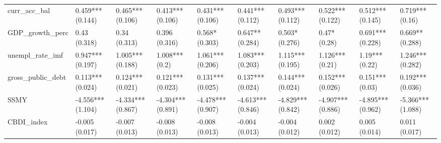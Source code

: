 \begin{table}[H]
\begin{subtable}[c]{\textwidth}
{\begin{tabular}{llllllllll}
  curr\_acc\_bal & 0.459*** (0.144) & 0.465*** (0.106) & 0.413*** (0.106) & 0.431*** (0.106) & 0.441*** (0.112) & 0.493*** (0.112) & 0.522*** (0.122) & 0.512*** (0.145) & 0.719*** (0.16) \\ 
  GDP\_growth\_perc & 0.43 (0.318) & 0.34 (0.313) & 0.396 (0.316) & 0.568* (0.303) & 0.647** (0.284) & 0.503* (0.276) & 0.47* (0.28) & 0.691*** (0.228) & 0.669** (0.288) \\ 
  unempl\_rate\_imf & 0.947*** (0.197) & 1.005*** (0.188) & 1.008*** (0.2) & 1.061*** (0.206) & 1.083*** (0.203) & 1.115*** (0.195) & 1.126*** (0.21) & 1.19*** (0.22) & 1.246*** (0.282) \\ 
  gross\_public\_debt & 0.113*** (0.024) & 0.124*** (0.021) & 0.121*** (0.023) & 0.131*** (0.025) & 0.137*** (0.024) & 0.144*** (0.024) & 0.152*** (0.026) & 0.151*** (0.03) & 0.192*** (0.036) \\ 
  SSMY & -4.556*** (1.104) & -4.334*** (0.867) & -4.304*** (0.891) & -4.478*** (0.907) & -4.613*** (0.846) & -4.829*** (0.842) & -4.907*** (0.886) & -4.895*** (0.962) & -5.366*** (1.088) \\ 
  CBDI\_index & -0.005 (0.017) & -0.007 (0.013) & -0.008 (0.013) & -0.008 (0.013) & -0.004 (0.013) & -0.004 (0.012) & 0.002 (0.012) & 0.005 (0.014) & 0.011 (0.017) \\ 
   \bottomrule
\end{tabular}}



\end{subtable}
\end{table}
